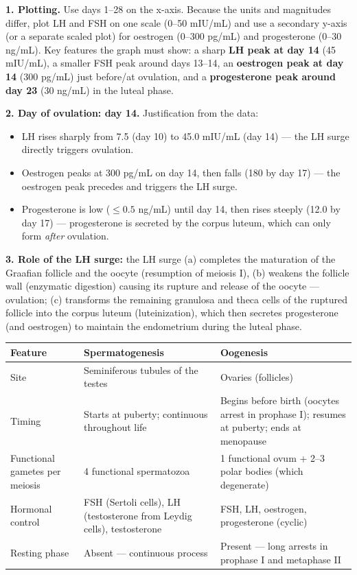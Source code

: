 \documentclass[11pt]{article}
\newcommand{\cle}[1]{{\popxbold\color{popdark}#1}}
\begin{document}
\begin{corrige}
\textbf{1. Plotting.} Use days 1–28 on the x-axis. Because the units and magnitudes differ, plot LH and FSH on one scale (0–50 mIU/mL) and use a secondary y-axis (or a separate scaled plot) for oestrogen (0–300 pg/mL) and progesterone (0–30 ng/mL). Key features the graph must show: a sharp \textbf{LH peak at day 14} (45 mIU/mL), a smaller FSH peak around days 13–14, an \textbf{oestrogen peak at day 14} (300 pg/mL) just before/at ovulation, and a \textbf{progesterone peak around day 23} (30 ng/mL) in the luteal phase.

\textbf{2. Day of ovulation: day 14.} Justification from the data:
\begin{itemize}
\item LH rises sharply from 7.5 (day 10) to 45.0 mIU/mL (day 14) — the \cle{LH surge} directly triggers ovulation.
\item Oestrogen peaks at 300 pg/mL on day 14, then falls (180 by day 17) — the oestrogen peak precedes and triggers the LH surge.
\item Progesterone is low ($\leq 0.5$ ng/mL) until day 14, then rises steeply (12.0 by day 17) — progesterone is secreted by the corpus luteum, which can only form \emph{after} ovulation.
\end{itemize}

\textbf{3. Role of the LH surge:} the LH surge (a) completes the maturation of the Graafian follicle and the oocyte (resumption of meiosis I), (b) weakens the follicle wall (enzymatic digestion) causing its rupture and release of the oocyte — ovulation; (c) transforms the remaining granulosa and theca cells of the ruptured follicle into the \cle{corpus luteum} (luteinization), which then secretes progesterone (and oestrogen) to maintain the endometrium during the luteal phase.
\end{corrige}

\begin{corrige}
\begin{center}
\begin{tabularx}{\linewidth}{|l|X|X|}
\hline
\rowcolor{popblueL} Feature & Spermatogenesis & Oogenesis \\
\hline
Site & Seminiferous tubules of the testes & Ovaries (follicles) \\
\hline
Timing & Starts at puberty; continuous throughout life & Begins before birth (oocytes arrest in prophase I); resumes at puberty; ends at menopause \\
\hline
Functional gametes per meiosis & 4 functional spermatozoa & 1 functional ovum + 2–3 polar bodies (which degenerate) \\
\hline
Hormonal control & FSH (Sertoli cells), LH (testosterone from Leydig cells), testosterone & FSH, LH, oestrogen, progesterone (cyclic) \\
\hline
Resting phase & Absent — continuous process & Present — long arrests in prophase I and metaphase II \\
\hline
\end{tabularx}
\end{center}
\end{corrige}
\end{document}
